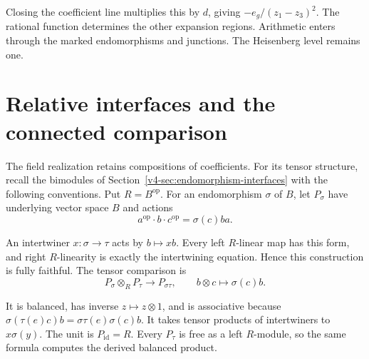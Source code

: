 Closing the coefficient line multiplies this by $d$, giving
$-e_g/(z_1-z_3)^2$. The rational function determines the other expansion
regions. Arithmetic enters through the marked endomorphisms and junctions.
The Heisenberg level remains one.

\section{Relative interfaces and the connected comparison}

The field realization retains compositions of coefficients. For its
tensor structure, recall the bimodules of
Section~\ref{v4-sec:endomorphism-interfaces} with the following conventions.
Put $R=B^{\mathrm{op}}$. For an endomorphism $\sigma$ of $B$, let
$P_\sigma$ have underlying vector space $B$ and actions
\[
 a^{\mathrm{op}}\cdot b\cdot c^{\mathrm{op}}=\sigma(c)ba.
\]

An intertwiner $x:\sigma\to\tau$ acts by $b\mapsto xb$.
Every left $R$-linear map has this form, and right $R$-linearity is exactly
the intertwining equation. Hence this construction is fully faithful.
The tensor comparison is
\begin{equation}\label{v4-arith:asi:bimodule-product}
 P_\sigma\otimes_R P_\tau\longrightarrow P_{\sigma\tau},\qquad
 b\otimes c\longmapsto\sigma(c)b.
\end{equation}

It is balanced, has inverse $z\mapsto z\otimes1$, and is associative
because $\sigma(\tau(e)c)b=\sigma\tau(e)\sigma(c)b$.
It takes tensor products of intertwiners to $x\sigma(y)$.
The unit is $P_{\mathrm{id}}=R$. Every $P_\tau$ is free as a left
$R$-module, so the same formula computes the derived balanced product.

